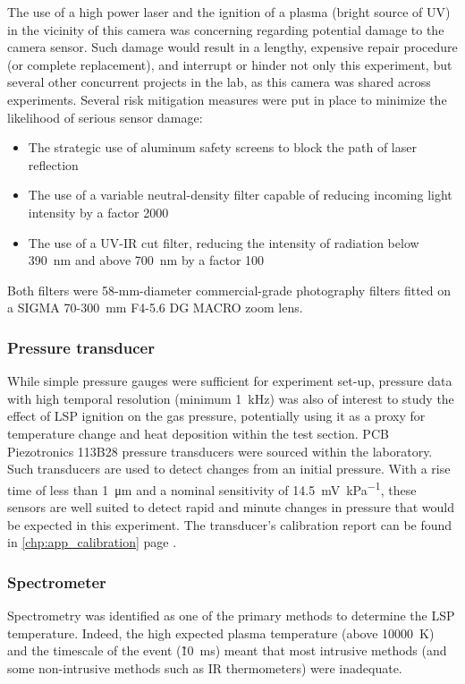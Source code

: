                 The use of a high power laser and the ignition of a plasma (bright source of UV) in the vicinity of this camera was concerning regarding potential damage to the camera sensor. Such damage would result in a lengthy, expensive repair procedure (or complete replacement), and interrupt or hinder not only this experiment, but several other concurrent projects in the lab, as this camera was shared across experiments. Several risk mitigation measures were put in place to minimize the likelihood of serious sensor damage:
                \begin{itemize}
                    \item The strategic use of aluminum safety screens to block the path of laser reflection
                    \item The use of a variable neutral-density filter capable of reducing incoming light intensity by a factor 2000
                    \item The use of a UV-IR cut filter, reducing the intensity of radiation below 390~nm and above 700~nm by a factor 100
                \end{itemize}
                Both filters were 58-mm-diameter commercial-grade photography filters fitted on a SIGMA 70-300~mm F4-5.6 DG MACRO zoom lens. 

                

            \subsubsection*{Pressure transducer}
                While simple pressure gauges were sufficient for experiment set-up, pressure data with high temporal resolution (minimum \qty{1}{kHz}) was also of interest to study the effect of LSP ignition on the gas pressure, potentially using it as a proxy for temperature change and heat deposition within the test section. PCB Piezotronics 113B28 pressure transducers were sourced within the laboratory. Such transducers are used to detect changes from an initial pressure. With a rise time of less than \qty{1}{\um} and a nominal sensitivity of \qty{14.5}{mV\per kPa}, these sensors are well suited to detect rapid and minute changes in pressure that would be expected in this experiment. The transducer's calibration report can be found in \autoref{chp:app_calibration} page \pageref*{ds:pcbPressure}.

            \subsubsection*{Spectrometer}
                Spectrometry was identified as one of the primary methods to determine the LSP temperature. Indeed, the high expected plasma temperature (above \qty{10000}{K}) and the timescale of the event (\~10~ms) meant that most intrusive methods (and some non-intrusive methods such as IR thermometers) were inadequate.

